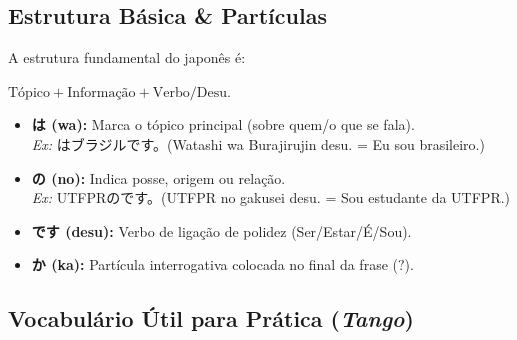 \documentclass[12pt,a4paper]{article}
\begin{document}
\subsection*{Estrutura Básica \& Partículas}

A estrutura fundamental do japonês é: \begin{center} $\text{Tópico} + \text{Informação} + \text{Verbo/Desu}$. \end{center}

\begin{itemize}[leftmargin=*]
    \item \textbf{は (wa):} Marca o tópico principal (sobre quem/o que se fala).\\
    \textit{Ex:} はブラジルです。(Watashi wa Burajirujin desu. = Eu sou brasileiro.)
    
    \item \textbf{の (no):} Indica posse, origem ou relação.\\
    \textit{Ex:} UTFPRのです。(UTFPR no gakusei desu. = Sou estudante da UTFPR.)

    \item \textbf{です (desu):} Verbo de ligação de polidez (Ser/Estar/É/Sou).
    
    \item \textbf{か (ka):} Partícula interrogativa colocada no final da frase ($?$).
\end{itemize}

\newpage

\subsection*{Vocabulário Útil para Prática (\textit{Tango})}

\vspace{0.2cm}
\end{document}
